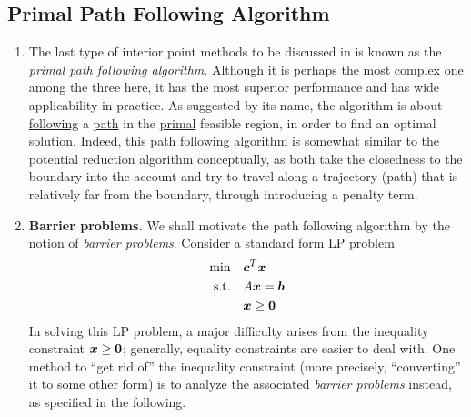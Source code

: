 \subsection{Primal Path Following Algorithm}
\begin{enumerate}
\item The last type of interior point methods to be discussed in
 is known as the \emph{primal path following
algorithm}. Although it is perhaps the most complex one among the three here,
it has the most superior performance and has wide applicability in practice.
As suggested by its name, the algorithm is about \underline{following} a
\underline{path} in the \underline{primal} feasible region, in order to find an
optimal solution. Indeed, this path following algorithm is somewhat similar to
the potential reduction algorithm conceptually, as both take the closedness to
the boundary into the account and try to travel along a trajectory
(path) that is relatively far from the boundary, through introducing
a penalty term.
\item \textbf{Barrier problems.} We shall motivate the path following algorithm
by the notion of \emph{barrier problems}. Consider a standard form LP problem
\begin{align*}
\text{min}\quad&\bm{c}^{T}\bm{x} \\
\text{s.t.}\quad&A\bm{x}=\bm{b} \\
&\bm{x}\ge \bm{0}
\end{align*}
In solving this LP problem, a major difficulty arises from the inequality
constraint \(\bm{x}\ge\bm{0}\); generally, equality constraints are easier
to deal with. One method to ``get rid of'' the inequality constraint (more
precisely, ``converting'' it to some other form) is to analyze the
associated \emph{barrier problems} instead, as specified in the following.


\end{enumerate}
